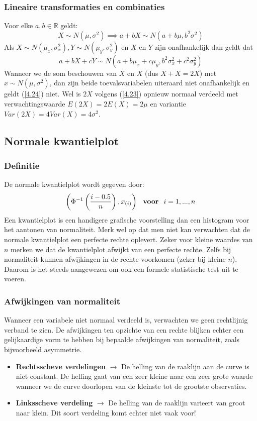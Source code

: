 \documentclass[titlepage]{article}
\numberwithin{equation}{section}
\begin{document}
\subsubsection{Lineaire transformaties en combinaties}
Voor elke $a, b \in \mathbb{R}$ geldt:
\begin{equation}
	X\sim N(\mu, \sigma^2) \implies a+bX \sim N(a+b\mu ,b^2\sigma^2)
	\label{4.23}
\end{equation}
Als $X \sim N(\mu_x,\sigma^2_x), Y \sim N(\mu_y, \sigma^2_y)$ en $X$ en $Y$ zijn onafhankelijk dan geldt dat
\begin{equation}
	a+bX+cY \sim N(a+b\mu_x + c\mu_y, b^2\sigma^2_x+c^2\sigma^2_y)
	\label{4.24}
\end{equation}
\danger Wanneer we de som beschouwen van $X$ en $X$ (dus $X+X=2X$) met $x \sim N(\mu,\sigma^2)$, dan zijn beide toevalsvariabelen uiteraard niet onafhankelijk en geldt (\ref{4.24}) niet. Wel is $2X$ volgens (\ref{4.23}) opnieuw normaal verdeeld met verwachtingswaarde $E(2X) = 2E(X) = 2 \mu$ en variantie $Var(2X) = 4Var(X) = 4\sigma^2$.
\subsection{Normale kwantielplot}
\subsubsection{Definitie}
De normale kwantielplot wordt gegeven door:
\begin{equation}
	\left(\Phi^{-1}\left(\frac{i-0.5}{n}\right),x_{(i)}\right) \text{ \textbf{ voor } } i = 1, ..., n
\end{equation}
Een kwantielplot is een handigere grafische voorstelling dan een histogram voor het aantonen van normaliteit. Merk wel op dat men niet kan verwachten dat de normale kwantielplot een perfecte rechte oplevert. Zeker voor kleine waardes van $n$ merken we dat de kwantielplot afwijkt van een perfecte rechte.\newline\newline
\danger Zelfs bij normaliteit kunnen afwijkingen in de rechte voorkomen (zeker bij kleine $n$). Daarom is het steeds aangewezen om ook een formele statistische test uit te voeren.
\subsubsection{Afwijkingen van normaliteit}
Wanneer een variabele niet normaal verdeeld is, verwachten we geen rechtlijnig verband te zien. De afwijkingen ten opzichte van een rechte blijken echter een gelijkaardige vorm te hebben bij bepaalde afwijkingen van normaliteit, zoals bijvoorbeeld asymmetrie. 
\begin{itemize}
	\item \textbf{Rechtsscheve verdelingen} $\rightarrow$ De helling van de raaklijn aan de curve is niet constant. De helling gaat van een zeer kleine naar een zeer grote waarde wanneer we de curve doorlopen van de kleinste tot de grootste observaties.
	\item \textbf{Linksscheve verdeling} $\rightarrow$ De helling van de raaklijn varieert van groot naar klein. Dit soort verdeling komt echter niet vaak voor!
\end{itemize}
\end{document}
